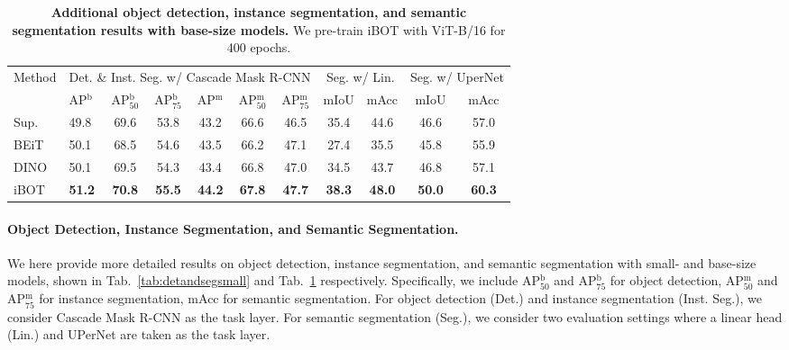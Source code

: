 \documentclass{article} %
\def\ourmethod{{iBOT}\xspace}
\begin{document}
\begin{table}[!tbp]
\caption{\textbf{Additional object detection, instance segmentation, and semantic segmentation results with base-size models.} We pre-train \ourmethod with ViT-B/16 for 400 epochs.}
\label{tab:detandsegbase}
\centering
\begin{tabular}{llccccccccc}
\multirow{2}{*}{Method} & \multicolumn{6}{c}{Det. \& Inst. Seg. w/ Cascade Mask R-CNN} & \multicolumn{2}{c}{Seg. w/ Lin.} & \multicolumn{2}{c}{Seg. w/ UperNet} \\
\cmidrule(lr){2-7}\cmidrule(lr){8-9}\cmidrule(lr){10-11}
& AP$^\mathrm{b}$ & AP$^\mathrm{b}_\mathrm{50}$ & AP$^\mathrm{b}_\mathrm{75}$ & AP$^\mathrm{m}$ & AP$^\mathrm{m}_\mathrm{50}$ & AP$^\mathrm{m}_\mathrm{75}$ & mIoU & mAcc & mIoU & mAcc \\
\toprule
\textcolor{gray!80}{Sup.} & \textcolor{gray!80}{49.8} & \textcolor{gray!80}{69.6} &  \textcolor{gray!80}{53.8} & \textcolor{gray!80}{43.2} & \textcolor{gray!80}{66.6} & \textcolor{gray!80}{46.5} & \textcolor{gray!80}{35.4} & \textcolor{gray!80}{44.6} & \textcolor{gray!80}{46.6} & \textcolor{gray!80}{57.0} \\
BEiT & 50.1 & 68.5 & 54.6 & 43.5 & 66.2 & 47.1 & 27.4 & 35.5 & 45.8 & 55.9 \\
DINO & 50.1 & 69.5 & 54.3 & 43.4 & 66.8 & 47.0 & 34.5 & 43.7 & 46.8 & 57.1 \\
\rowcolor{cyan!50}
\ourmethod & \bf 51.2 & \bf 70.8 & \bf 55.5 & \bf 44.2 & \bf 67.8 & \bf 47.7 & \bf 38.3 & \bf 48.0 & \bf 50.0 & \bf 60.3 \\
\bottomrule
\end{tabular}
\end{table}

\paragraph{Object Detection, Instance Segmentation, and Semantic Segmentation.} 
We here provide more detailed results on object detection, instance segmentation, and semantic segmentation with small- and base-size models, shown in Tab.~\ref{tab:detandsegsmall} and Tab.~\ref{tab:detandsegbase} respectively. 
Specifically, we include AP$^\mathrm{b}_\mathrm{50}$ and AP$^\mathrm{b}_\mathrm{75}$ for object detection, AP$^\mathrm{m}_\mathrm{50}$ and AP$^\mathrm{m}_\mathrm{75}$ for instance segmentation, mAcc for semantic segmentation.
For object detection (Det.) and instance segmentation (Inst. Seg.), we consider Cascade Mask R-CNN as the task layer. For semantic segmentation (Seg.), we consider two evaluation settings where a linear head (Lin.) and UPerNet are taken as the task layer. 
\end{document}
